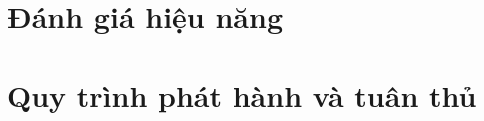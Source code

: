 \section{Đánh giá hiệu năng}
\label{sec:hieu-nang}

\section{Quy trình phát hành và tuân thủ}
\label{sec:phat-hanh}

